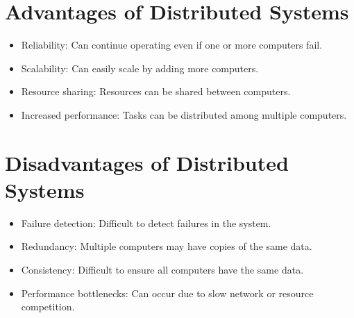 \documentclass{article}
\begin{document}
\section{Advantages of Distributed Systems}
\begin{itemize}
    \item Reliability: Can continue operating even if one or more computers fail.
    \item Scalability: Can easily scale by adding more computers.
    \item Resource sharing: Resources can be shared between computers.
    \item Increased performance: Tasks can be distributed among multiple computers.
\end{itemize}

\section{Disadvantages of Distributed Systems}
\begin{itemize}
    \item Failure detection: Difficult to detect failures in the system.
    \item Redundancy: Multiple computers may have copies of the same data.
    \item Consistency: Difficult to ensure all computers have the same data.
    \item Performance bottlenecks: Can occur due to slow network or resource competition.
\end{itemize}
\end{document}
